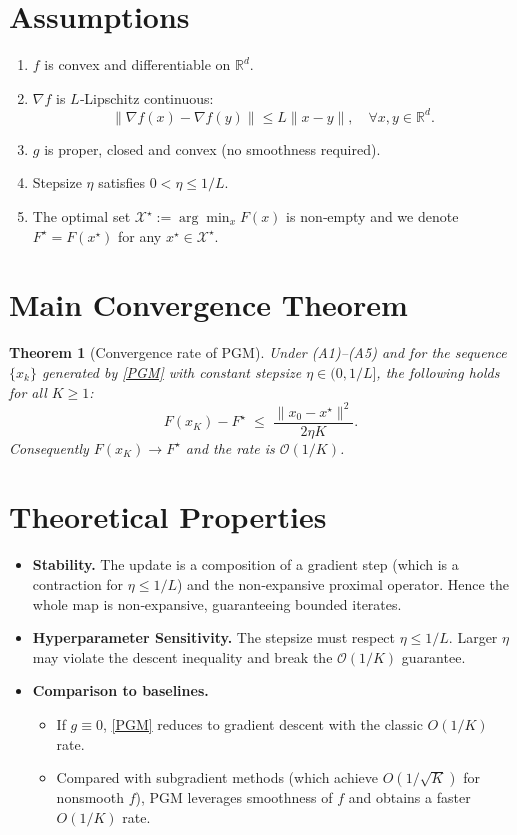 \documentclass{article}
\newtheorem{theorem}{Theorem}
\newcommand{\grad}{\nabla}
\begin{document}
\section*{Assumptions}
\begin{enumerate}
\item[(A1)] $f$ is convex and differentiable on $\mathbb{R}^{d}$.
\item[(A2)] $\grad f$ is $L$‑Lipschitz continuous:
\[
\|\grad f(x)-\grad f(y)\|\le L\|x-y\|,\quad\forall x,y\in\mathbb{R}^{d}.
\]
\item[(A3)] $g$ is proper, closed and convex (no smoothness required).
\item[(A4)] Stepsize $\eta$ satisfies $0<\eta\le 1/L$.
\item[(A5)] The optimal set $\mathcal{X}^{\star}:=\arg\min_{x}F(x)$ is non‑empty and we denote $F^{\star}=F(x^{\star})$ for any $x^{\star}\in\mathcal{X}^{\star}$.
\end{enumerate}

\section*{Main Convergence Theorem}
\begin{theorem}[Convergence rate of PGM]\label{thm:rate}
Under (A1)–(A5) and for the sequence $\{x_k\}$ generated by \eqref{PGM} with constant stepsize $\eta\in(0,1/L]$, the following holds for all $K\ge1$:
\[
F(x_{K})-F^{\star}\;\le\;\frac{\|x_{0}-x^{\star}\|^{2}}{2\eta K}.
\tag{T1}
\]
Consequently $F(x_{K})\to F^{\star}$ and the rate is $\mathcal{O}(1/K)$.
\end{theorem}

\section*{Theoretical Properties}
\begin{itemize}
\item \textbf{Stability.} The update is a composition of a gradient step (which is a contraction for $\eta\le 1/L$) and the non‑expansive proximal operator. Hence the whole map is non‑expansive, guaranteeing bounded iterates.
\item \textbf{Hyperparameter Sensitivity.} The stepsize must respect $\eta\le 1/L$. Larger $\eta$ may violate the descent inequality and break the $\mathcal{O}(1/K)$ guarantee.
\item \textbf{Comparison to baselines.}
    \begin{itemize}
        \item If $g\equiv0$, \eqref{PGM} reduces to gradient descent with the classic $O(1/K)$ rate.
        \item Compared with subgradient methods (which achieve $O(1/\sqrt{K})$ for nonsmooth $f$), PGM leverages smoothness of $f$ and obtains a faster $O(1/K)$ rate.
    \end{itemize}
\end{itemize}
\end{document}
